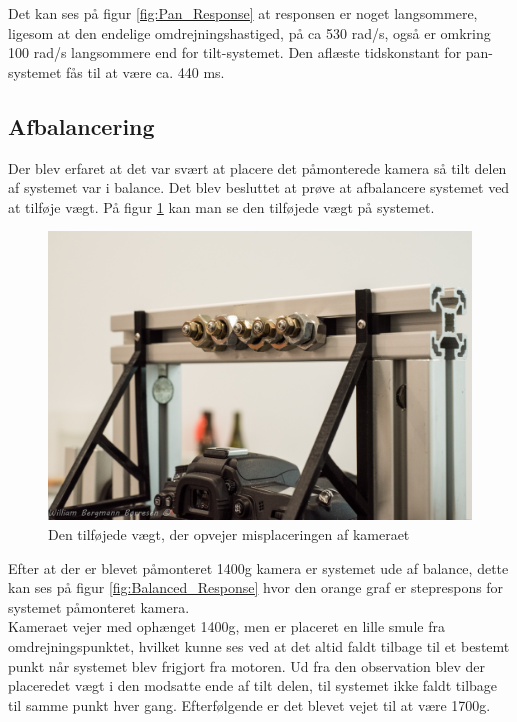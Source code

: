Det kan ses på figur \ref{fig:Pan_Response} at responsen er noget langsommere, ligesom at den endelige omdrejningshastiged, på ca 530 rad/s, også er omkring 100 rad/s langsommere end for tilt-systemet. Den aflæste tidskonstant for pan-systemet fås til at være ca. 440 ms.

\subsection{Afbalancering}

Der blev erfaret at det var svært at placere det påmonterede kamera så tilt delen af systemet var i balance. Det blev besluttet at prøve at afbalancere systemet ved at tilføje vægt. På figur \ref{fig:Afbalancering} kan man se den tilføjede vægt på systemet.

\begin{figure}[!hb]
	\begin{center}
		\includegraphics[scale=0.1]{Billeder/Afbalancering.jpg}
		\caption{Den tilføjede vægt, der opvejer misplaceringen af kameraet}
		\label{fig:Afbalancering}
	\end{center}
\end{figure}

Efter at der er blevet påmonteret 1400g kamera er systemet ude af balance, dette kan ses på figur \ref{fig:Balanced_Response} hvor den orange graf er steprespons for systemet påmonteret kamera.\\

Kameraet vejer med ophænget 1400g, men er placeret en lille smule fra omdrejningspunktet, hvilket kunne ses ved at det altid faldt tilbage til et bestemt punkt når systemet blev frigjort fra motoren.
Ud fra den observation blev der placeredet vægt i den modsatte ende af tilt delen, til systemet ikke faldt tilbage til samme punkt hver gang. Efterfølgende er det blevet vejet til at være 1700g.

